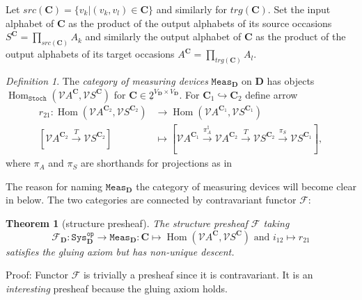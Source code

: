 \documentclass[12pt]{article}
\DeclareMathOperator{\Hom}{Hom}
\newcommand{\vecify}{{\mathcal V}}
\newcommand{\Act}{{A}}
\newcommand{\Sit}{{S}}
\newcommand{\occ}{{v}}
\newcommand{\univ}{{\mathbf D}}
\newcommand{\mangle}{{\mathbf C}}
\newcommand{\psheaf}{{\mathcal F}}
\newcommand{\scat}{{\mathtt{Stoch}}}
\newcommand{\subs}{{\mathtt{Sys}}}
\newcommand{\mcat}{{\mathtt{Meas}}}
\newtheorem{thm}{Theorem}
\theoremstyle{remark}
\newtheorem{defn}{Definition}
\begin{document}
Let $src(\mangle)=\{\occ_k|(\occ_k,\occ_l)\in\mangle\}$ and similarly for $trg(\mangle)$. Set the input alphabet of $\mangle$ as the product of the output alphabets of its source occasions $\Sit^\mangle=\prod_{src(\mangle)}A_k$ and similarly the output alphabet of $\mangle$ as the product of the output alphabets of its target occasions $\Act^\mangle=\prod_{trg(\mangle)}A_l$. 
\begin{defn}
	The \emph{category of measuring devices} $\mcat_\univ$ on $\univ$ has objects $\Hom_\scat(\vecify \Act^\mangle,\vecify \Sit^\mangle)$ for $\mangle\in \underline{2}^{V_\univ\times V_\univ}$. For $\mangle_1\hookrightarrow \mangle_2$ define arrow 
	\begin{align*}
		r_{21}:\Hom\left(\vecify \Act^{\mangle_2},\vecify \Sit^{\mangle_2}\right) & \rightarrow \Hom\left(\vecify \Act^{\mangle_1},\vecify \Sit^{\mangle_1}\right)\\
		\left[\vecify \Act^{\mangle_2}\xrightarrow{T}\vecify \Sit^{\mangle_2}\right]
		 & \mapsto \left[\vecify \Act^{\mangle_1}\xrightarrow{\pi^\natural_\Act}
		\vecify\Act^{\mangle_2}\xrightarrow{T}\vecify\Sit^{\mangle_2}
		\xrightarrow{\pi_\Sit}\vecify\Sit^{\mangle_1}
		\right],
	\end{align*}
	where $\pi_A$ and $\pi_S$ are shorthands for projections 
    as in %
\end{defn}

The reason for naming $\mcat_\univ$ the category of measuring 
devices will become clear in %
below. The two categories are connected by contravariant 
functor $\psheaf$:

\begin{thm}
	[structure presheaf]
	\label{t:presheaf}
	The \emph{structure presheaf} $\psheaf$ taking
	\begin{equation*}
		\psheaf_\univ:\subs_\univ^{\mathtt{op}}\rightarrow 
        \mcat_\univ:
		\mangle\mapsto\Hom\left(\vecify\Act^\mangle,
        \vecify\Sit^\mangle\right)
		\mbox{ and }
		i_{12}\mapsto r_{21}
	\end{equation*}
	satisfies the gluing axiom but has non-unique descent.
\end{thm}

\noindent
Proof: Functor $\psheaf$ is trivially a presheaf since it is 
contravariant. It is an \emph{interesting} presheaf because 
the gluing axiom holds. 
\end{document}
